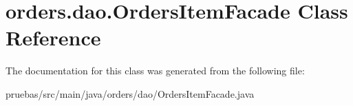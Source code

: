 \hypertarget{classorders_1_1dao_1_1_orders_item_facade}{}\section{orders.\+dao.\+Orders\+Item\+Facade Class Reference}
\label{classorders_1_1dao_1_1_orders_item_facade}


The documentation for this class was generated from the following file\+:\begin{DoxyCompactItemize}
\item 
pruebas/src/main/java/orders/dao/Orders\+Item\+Facade.\+java\end{DoxyCompactItemize}
